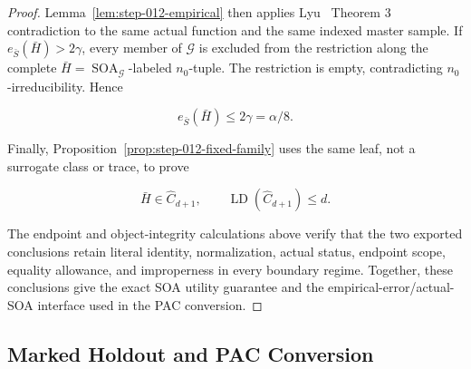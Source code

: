 \begin{proof}
Lemma~\ref{lem:step-012-empirical} then applies Lyu~\citep{lyu2025} Theorem 3
contradiction to the same actual function and the same indexed master
sample. If \(e_{\bar S}(\bar H)>2\gamma\), every member of
\(\mathcal G\) is excluded from the restriction along the complete
\(\bar H=\operatorname{SOA}_{\mathcal G}\)-labeled \(n_0\)-tuple. The
restriction is empty, contradicting \(n_0\)-irreducibility. Hence

\[
 e_{\bar S}(\bar H)\le2\gamma=\alpha/8.
\]

Finally, Proposition~\ref{prop:step-012-fixed-family} uses the same leaf,
not a surrogate class or trace, to prove

\[
 \bar H\in\widehat C_{d+1},
 \qquad
 \operatorname{LD}(\widehat C_{d+1})\le d.
\]

The endpoint and object-integrity calculations above verify that the two exported
conclusions retain literal identity, normalization, actual status, endpoint
scope, equality allowance, and improperness in every boundary
regime. Together, these conclusions give the exact SOA utility guarantee
and the empirical-error/actual-SOA interface used in the PAC conversion.



\end{proof}

\subsection{Marked Holdout and PAC Conversion}\label{app:step_013}


